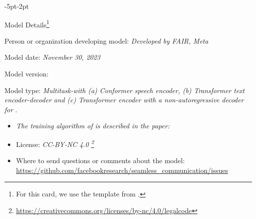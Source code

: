 \newpage
\begin{adjustwidth}{-5pt}{-2pt}
\begin{singlespace}
\begin{tcolorbox}[title=\textbf{\section{Model Card - \mfourttwo}\label{card:mfourttwo}},
    breakable, sharp corners, boxrule=0.5pt] 
\begin{mcsection}{Model Details\footnote{For this card, we use the template from \citet{10.1145/3287560.3287596}.}} 
\item Person or organization developing model: \textit{Developed by FAIR, Meta}
\item Model date: \textit{November 30, 2023}
\item Model version: \mfourtlgtwo 
\item Model type: \textit{Multitask-\unitytwo with (a) Conformer speech encoder, (b) Transformer text encoder-decoder and (c) Transformer encoder with a non-autoregressive decoder for \tu}.
\begin{itemize}
    \item \it The training algorithm of \mfourtlgtwo is described in the paper: \seamlesscitation 
\item License: \textit{CC-BY-NC 4.0
\footnote{\url{https://creativecommons.org/licenses/by-nc/4.0/legalcode}}}
\item Where to send questions or comments about the model: \\
\url{https://github.com/facebookresearch/seamless_communication/issues}
\end{itemize} 
\end{mcsection}



\end{tcolorbox}
\end{singlespace}
\end{adjustwidth}
